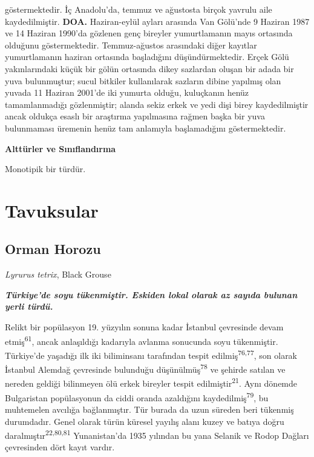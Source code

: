 \documentclass[
  letterpaper,
  DIV=11,
  numbers=noendperiod]{scrreprt}
\begin{document}
göstermektedir. İç Anadolu'da, temmuz ve ağustosta birçok yavrulu aile
kaydedilmiştir. \textbf{DOA.} Haziran-eylül ayları arasında Van Gölü'nde
9 Haziran 1987 ve 14 Haziran 1990'da gözlenen genç bireyler
yumurtlamanın mayıs ortasında olduğunu göstermektedir. Temmuz-ağustos
arasındaki diğer kayıtlar yumurtlamanın haziran ortasında başladığını
düşündürmektedir. Erçek Gölü yakınlarındaki küçük bir gölün ortasında
dikey sazlardan oluşan bir adada bir yuva bulunmuştur; sucul bitkiler
kullanılarak sazların dibine yapılmış olan yuvada 11 Haziran 2001'de iki
yumurta olduğu, kuluçkanın henüz tamamlanmadığı gözlenmiştir; alanda
sekiz erkek ve yedi dişi birey kaydedilmiştir ancak oldukça esaslı bir
araştırma yapılmasına rağmen başka bir yuva bulunmaması üremenin henüz
tam anlamıyla başlamadığını göstermektedir.

\textbf{Alttürler ve Sınıflandırma}

Monotipik bir türdür.


\chapter{Tavuksular}\label{tavuksular}

\section{Orman Horozu}\label{orman-horozu}

\emph{Lyrurus tetrix}, Black Grouse

\textbf{\emph{Türkiye'de soyu tükenmiştir. Eskiden lokal olarak az
sayıda bulunan yerli türdü.}}

Relikt bir popülasyon 19. yüzyılın sonuna kadar İstanbul çevresinde
devam etmiş\textsuperscript{61}, ancak anlaşıldığı kadarıyla avlanma
sonucunda soyu tükenmiştir. Türkiye'de yaşadığı ilk iki biliminsanı
tarafından tespit edilmiş\textsuperscript{76,77}, son olarak İstanbul
Alemdağ çevresinde bulunduğu düşünülmüş\textsuperscript{78} ve şehirde
satılan ve nereden geldiği bilinmeyen ölü erkek bireyler tespit
edilmiştir\textsuperscript{21}. Aynı dönemde Bulgaristan popülasyonun da
ciddi oranda azaldığını kaydedilmiş\textsuperscript{79}, bu muhtemelen
avcılığa bağlanmıştır. Tür burada da uzun süreden beri tükenmiş
durumdadır. Genel olarak türün küresel yayılış alanı kuzey ve batıya
doğru daralmıştır\textsuperscript{22,80,81} Yunanistan'da 1935 yılından
bu yana Selanik ve Rodop Dağları çevresinden dört kayıt vardır.
\end{document}
